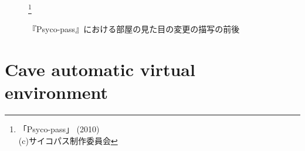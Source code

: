 \begin{figure}[htbp]
  \begin{minipage}{0.5\hsize}
    \begin{center}
      \caption{}
    \end{center}
  \end{minipage}
  \begin{minipage}{0.5\hsize}
    \begin{center}
    \end{center}
  \end{minipage}
  \caption{『Psyco-pass』における部屋の見た目の変更の描写の前後}
  \footnote{「Psyco-pass」 (2010)\\(c)サイコパス制作委員会}
\end{figure}

\section{Cave automatic virtual environment}


